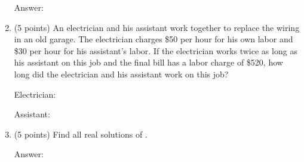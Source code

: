 \documentclass[12pt]{article}
\begin{document}
\begin{enumerate}
\begin{flushright}{ Answer:\underline{\hspace{2in}}}\end{flushright}
\vfill
\newpage
\item (5 points) An electrician and his assistant work together to replace the wiring in an old garage. The electrician charges \$50 per hour for his own labor and \$30 per hour for his assistant's labor. If the electrician works twice as long as his assistant on this job and the final bill has a labor charge of \$520, how long did the electrician and his assistant work on this job?
\begin{flushright}{ Electrician:\underline{\hspace{2in}}}\end{flushright}
\begin{flushright}{ Assistant:\underline{\hspace{2in}}}\end{flushright}
\vfill
\item (5 points) Find all real solutions of . 
\begin{flushright}{ Answer:\underline{\hspace{2in}}}\end{flushright}
\vfill


\end{enumerate}
\end{document}
